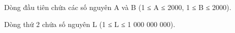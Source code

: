 Dòng đầu tiên chứa các số nguyên A và B (1 ≤ A ≤ 2000, 1 ≤ B ≤ 2000).  

   Dòng thứ 2 chứa số nguyên L (1 ≤ L ≤ 1 000 000 000).  

\
